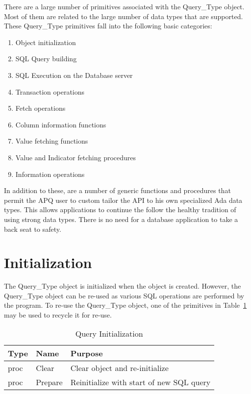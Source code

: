 \documentclass[english,letterpaper]{book}
\begin{document}
There are a large number of primitives associated with the Query\_Type
object. Most of them are related to the large number of data types
that are supported. These Query\_Type primitives fall into the following
basic categories:

\begin{enumerate}
   \item Object initialization
   \item SQL Query building
   \item SQL Execution on the Database server
   \item Transaction operations
   \item Fetch operations
   \item Column information functions
   \item Value fetching functions
   \item Value and Indicator fetching procedures
   \item Information operations
\end{enumerate}

In addition to these, are a number of generic functions and procedures
that permit the APQ user to custom tailor the API to his own specialized
Ada data types. This allows applications to continue the follow the
healthy tradition of using strong data types. There is no need for
a database application to take a back seat to safety.

\section{Initialization \label{SQL Initialization}}

The Query\_Type object is initialized when the object is created.
However, the Query\-\_Type object can be re-used as various SQL
operations are performed by the program. To re-use the Query\_Type
object, one of the primitives in Table~\ref{t:qinit} may be used to recycle it for
re-use.

\begin{table}
   \begin{center}
      \begin{tabular}{lll}
         Type  &  Name     &  Purpose\\
         \hline
         proc  &  Clear    &  Clear object and re-initialize\\
         proc  &  Prepare  &  Reinitialize with start of new SQL query\\
      \end{tabular}
   \end{center}
   \caption{Query Initialization}\label{t:qinit}
\end{table}
\end{document}
